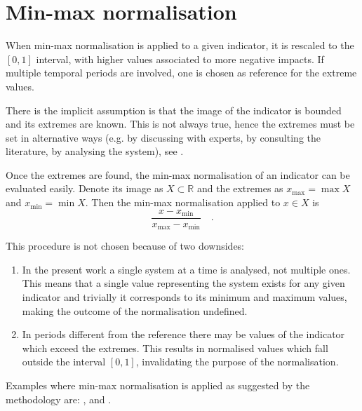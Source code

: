 \appendix



\section{Min-max normalisation}
\label{sec:Min-max normalisation}
When min-max normalisation is applied to a given \gls{indicator}, it is rescaled to the $[0, 1]$ interval, with higher values associated to more negative \glspl{impact}. If multiple temporal periods are involved, one is chosen as reference for the extreme values.\cite[85]{2008OECDHandbookOn}

There is the implicit assumption is that the image of the \gls{indicator} is bounded and its extremes are known. This is not always true, hence the extremes must be set in alternative ways (e.g. by discussing with experts, by consulting the literature, by analysing the system), see \cite[113-115]{2017GIZTheVulnerability}.

Once the extremes are found, the min-max normalisation of an \gls{indicator} can be evaluated easily. Denote its image as $X \subset \mathbb{R}$ and the extremes as $x_\text{max} = \max X$ and $x_\text{min} = \min X$. Then the min-max normalisation applied to $x \in X$ is
\begin{equation}
  \label{eq:min-max}
  \frac{x - x_\text{min}}{x_\text{max} - x_\text{min}}
  \quad .
\end{equation}

This procedure is not chosen because of two downsides:
\begin{enumerate}
  \item In the present work a single system at a time is analysed, not multiple ones. This means that a single value representing the system exists for any given \gls{indicator} and trivially it corresponds to its minimum and maximum values, making the outcome of the normalisation undefined.
  \item In periods different from the reference there may be values of the \gls{indicator} which exceed the extremes. This results in normalised values which fall outside the interval $[0, 1]$, invalidating the purpose of the normalisation.
\end{enumerate}

Examples where min-max normalisation is applied as suggested by the methodology are: \cite[6]{2023DeVivoApplicationOf}, \cite[6]{2023DeVivoClimate-RiskAssessment} and \cite[74]{2017GIZVulnerabilitySourcebook}.



